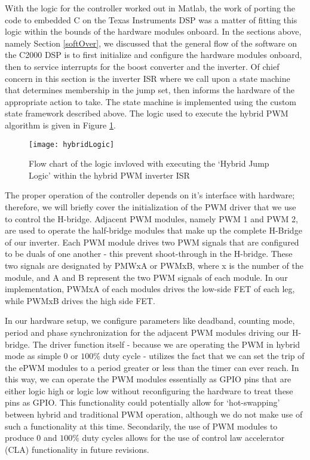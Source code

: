 With the logic for the controller worked out in Matlab, the work of porting the code to embedded C on the Texas Instruments DSP was a matter of fitting this logic within the bounds of the hardware modules onboard.
In the sections above, namely Section \ref{softOver}, we discussed that the general flow of the software on the C2000 DSP is to first initialize and configure the hardware modules onboard, then to service interrupts for the boost converter and the inverter. Of chief concern in this section is the inverter ISR where we call upon a state machine that determines membership in the jump set, then informs the hardware of the appropriate action to take. The state machine is implemented using the custom state framework described above. The logic used to execute the hybrid PWM algorithm is given in Figure \ref{hybridFlow}.

\begin{figure}[h]
\begin{center}
\texttt{[image: hybridLogic]}
\caption{Flow chart of the logic invloved with executing the `Hybrid Jump Logic' within the hybrid PWM inverter ISR}
\label{hybridFlow}
\end{center}
\end{figure}

The proper operation of the controller depends on it's interface with hardware; therefore, we will briefly cover the initialization of the PWM driver that we use to control the H-bridge. Adjacent PWM modules, namely PWM 1 and PWM 2, are used to operate the half-bridge modules that make up the complete H-Bridge of our inverter. Each PWM module drives two PWM signals that are configured to be duals of one another - this prevent shoot-through in the H-bridge. These two signals are designated by PMWxA or PWMxB, where x is the number of the module, and A and B represent the two PWM signals of each module. In our implementation, PWMxA of each modules drives the low-side FET of each leg, while PWMxB drives the high side FET. 

In our hardware setup, we configure parameters like deadband, counting mode, period and phase synchronization for the adjacent PWM modules driving our H-bridge. The driver function itself - because we are operating the PWM in hybrid mode as simple $0$ or $100\%$ duty cycle - utilizes the fact that we can set the trip of the ePWM modules to a period greater or less than the timer can ever reach. In this way, we can operate the PWM modules essentially as GPIO pins that are either logic high or logic low without reconfiguring the hardware to treat these pins as GPIO. This functionality could potentially allow for `hot-swapping' between hybrid and traditional PWM operation, although we do not make use of such a functionality at this time. Secondarily, the use of PWM modules to produce $0$ and $100\%$ duty cycles allows for the use of control law accelerator (CLA) functionality in future revisions. 

